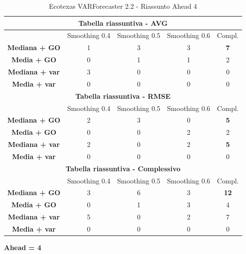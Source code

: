 \documentclass[12pt,a4paper,oneside,openright]{book}
\begin{document}
\begin{table}[H]
\centering
\begin{tabular}{|c|c|c|c|c|}
\hline
\multicolumn{5}{|c|}{\textbf{Tabella riassuntiva - AVG}} \\
\hline
& Smoothing 0.4 & Smoothing 0.5 & Smoothing 0.6 & Compl.\\
\hline
\textbf{Mediana + GO} & 1 & 3 & 3 & \textbf{7}\\ 
\hline
\textbf{Media + GO} & 0 & 1 & 1 & 2\\ 
\hline
\textbf{Mediana + var} & 3 & 0 & 0 & 0\\ 
\hline
\textbf{Media + var} & 0 & 0 & 0 & 0\\ 
\hline
\multicolumn{5}{|c|}{\textbf{Tabella riassuntiva - RMSE}} \\
\hline
& Smoothing 0.4 & Smoothing 0.5 & Smoothing 0.6 & Compl.\\
\hline
\textbf{Mediana + GO} & 2 & 3 & 0 & \textbf{5}\\ 
\hline
\textbf{Media + GO} & 0 & 0 & 2 & 2\\ 
\hline
\textbf{Mediana + var} & 2 & 0 & 2 & \textbf{5}\\ 
\hline
\textbf{Media + var} & 0 & 0 & 0 & 0\\ 
\hline
\multicolumn{5}{|c|}{\textbf{Tabella riassuntiva - Complessivo}} \\
\hline
& Smoothing 0.4 & Smoothing 0.5 & Smoothing 0.6 & Compl.\\
\hline
\textbf{Mediana + GO} & 3 & 6 & 3 & \textbf{12}\\ 
\hline
\textbf{Media + GO} & 0 & 1 & 3 & 4\\ 
\hline
\textbf{Mediana + var} & 5 & 0 & 2 & 7\\ 
\hline
\textbf{Media + var} & 0 & 0 & 0 & 0\\ 
\hline
\end{tabular} 
\caption{Ecotexas VARForecaster 2.2 - Riassunto Ahead 4}
\end{table}

\newpage

\textbf{Ahead = 4}

\medskip
\end{document}
